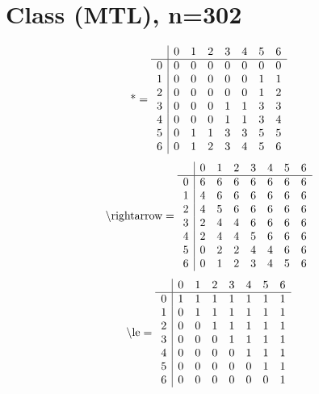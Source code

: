 \documentclass[11pt]{article}
\begin{document}
\section{Class (MTL), n=302}
\[\text{*} = 
\begin{array}{r | r r r r r r r}
 & 0 & 1 & 2 & 3 & 4 & 5 & 6 \\ \hline
0 & 0 & 0 & 0 & 0 & 0 & 0 & 0 \\
1 & 0 & 0 & 0 & 0 & 0 & 1 & 1 \\
2 & 0 & 0 & 0 & 0 & 0 & 1 & 2 \\
3 & 0 & 0 & 0 & 1 & 1 & 3 & 3 \\
4 & 0 & 0 & 0 & 1 & 1 & 3 & 4 \\
5 & 0 & 1 & 1 & 3 & 3 & 5 & 5 \\
6 & 0 & 1 & 2 & 3 & 4 & 5 & 6 \\
\end{array}
\]
\[\text{\textbackslash rightarrow} = 
\begin{array}{r | r r r r r r r}
 & 0 & 1 & 2 & 3 & 4 & 5 & 6 \\ \hline
0 & 6 & 6 & 6 & 6 & 6 & 6 & 6 \\
1 & 4 & 6 & 6 & 6 & 6 & 6 & 6 \\
2 & 4 & 5 & 6 & 6 & 6 & 6 & 6 \\
3 & 2 & 4 & 4 & 6 & 6 & 6 & 6 \\
4 & 2 & 4 & 4 & 5 & 6 & 6 & 6 \\
5 & 0 & 2 & 2 & 4 & 4 & 6 & 6 \\
6 & 0 & 1 & 2 & 3 & 4 & 5 & 6 \\
\end{array}
\]
\[\text{\textbackslash le} = 
\begin{array}{r | r r r r r r r}
 & 0 & 1 & 2 & 3 & 4 & 5 & 6 \\ \hline
0 & 1 & 1 & 1 & 1 & 1 & 1 & 1 \\
1 & 0 & 1 & 1 & 1 & 1 & 1 & 1 \\
2 & 0 & 0 & 1 & 1 & 1 & 1 & 1 \\
3 & 0 & 0 & 0 & 1 & 1 & 1 & 1 \\
4 & 0 & 0 & 0 & 0 & 1 & 1 & 1 \\
5 & 0 & 0 & 0 & 0 & 0 & 1 & 1 \\
6 & 0 & 0 & 0 & 0 & 0 & 0 & 1 \\
\end{array}
\]
\end{document}
